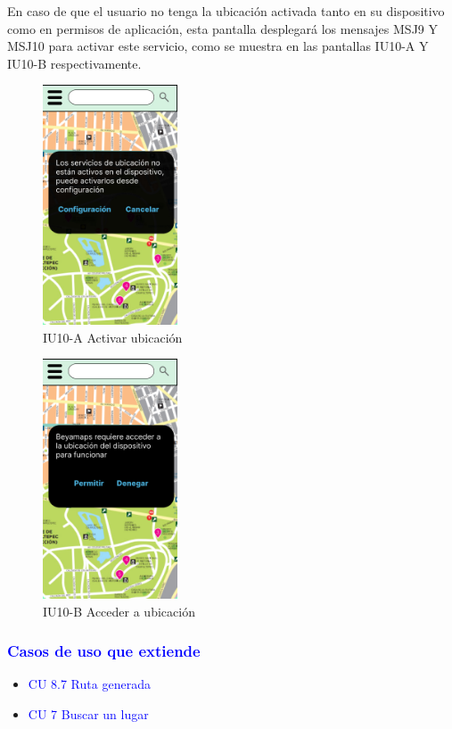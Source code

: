 En caso de que el usuario no tenga la ubicación activada tanto en su dispositivo como en permisos de aplicación, esta pantalla desplegará los mensajes MSJ9 Y MSJ10 para activar este servicio, como se muestra en las pantallas IU10-A Y IU10-B respectivamente.
\newpage
    \begin{figure}[h]
        \centering
        \includegraphics[width= 4cm]{Pantallas Prototipo3/IU11 - Activar ubicacion.jpg}
        \caption{IU10-A Activar ubicación}
        \label{fig:enter-label}
    \end{figure}
    
        \begin{figure}[h]
        \centering
        \includegraphics[width= 4cm]{Pantallas Prototipo3/IU12 Pantalla Acceso Ubicacion.jpg}
        \caption{IU10-B Acceder a ubicación}
        \label{fig:enter-label}
    \end{figure}
\subsubsection{\textcolor{blue}{Casos de uso que extiende}}
\begin{itemize}
    \item {\textcolor{blue}{CU 8.7 Ruta generada}}
    \item {\textcolor{blue}{CU 7 Buscar un lugar}}
\end{itemize}


